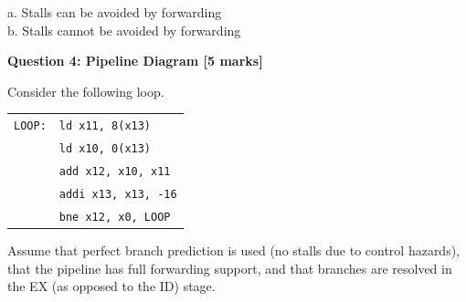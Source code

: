 \documentclass[addpoints]{exam}
\begin{document}
\begin{sloppypar}
\begin{questions}
\begin{parts}
\begin{solution}
            a. Stalls can be avoided by forwarding \\ 
            b. Stalls cannot be avoided by forwarding 
        \end{solution}
    \end{parts}
        
    \question[5]
    \begin{center}
        \textbf{Question 4: Pipeline Diagram [5 marks]}
    \end{center}

    Consider the following loop. \\
    \begin{tabular}{r l} 
        \texttt{LOOP:} & \texttt{ld x11, 8(x13)} \\ 
        & \texttt{ld x10, 0(x13)} \\ 
        & \texttt{add x12, x10, x11} \\ 
        & \texttt{addi x13, x13, -16} \\ 
        & \texttt{bne x12, x0, LOOP}
    \end{tabular}

    Assume that perfect branch prediction is used (no stalls due to control hazards), that the pipeline has full forwarding support, and that branches are resolved in the EX (as opposed to the ID) stage. 
\end{questions}
\end{sloppypar}
\end{document}
